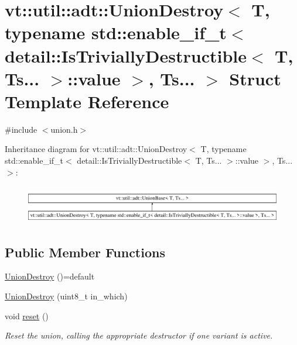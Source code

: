 \hypertarget{structvt_1_1util_1_1adt_1_1_union_destroy_3_01_t_00_01typename_01std_1_1enable__if__t_3_01detail42179a636679a7a81522739bdddb7210}{}\section{vt\+:\+:util\+:\+:adt\+:\+:Union\+Destroy$<$ T, typename std\+:\+:enable\+\_\+if\+\_\+t$<$ detail\+:\+:Is\+Trivially\+Destructible$<$ T, Ts... $>$\+:\+:value $>$, Ts... $>$ Struct Template Reference}
\label{structvt_1_1util_1_1adt_1_1_union_destroy_3_01_t_00_01typename_01std_1_1enable__if__t_3_01detail42179a636679a7a81522739bdddb7210}


{\ttfamily \#include $<$union.\+h$>$}

Inheritance diagram for vt\+:\+:util\+:\+:adt\+:\+:Union\+Destroy$<$ T, typename std\+:\+:enable\+\_\+if\+\_\+t$<$ detail\+:\+:Is\+Trivially\+Destructible$<$ T, Ts... $>$\+:\+:value $>$, Ts... $>$\+:\begin{figure}[H]
\begin{center}
\leavevmode
\includegraphics[height=1.704718cm]{structvt_1_1util_1_1adt_1_1_union_destroy_3_01_t_00_01typename_01std_1_1enable__if__t_3_01detail42179a636679a7a81522739bdddb7210}
\end{center}
\end{figure}
\subsection*{Public Member Functions}
\begin{DoxyCompactItemize}
\item 
\hyperlink{structvt_1_1util_1_1adt_1_1_union_destroy_3_01_t_00_01typename_01std_1_1enable__if__t_3_01detail42179a636679a7a81522739bdddb7210_a9754ad167ee9844764f02d976110d53e}{Union\+Destroy} ()=default
\item 
\hyperlink{structvt_1_1util_1_1adt_1_1_union_destroy_3_01_t_00_01typename_01std_1_1enable__if__t_3_01detail42179a636679a7a81522739bdddb7210_aab76556b3fdd29b060495fdce22a5c83}{Union\+Destroy} (uint8\+\_\+t in\+\_\+which)
\item 
void \hyperlink{structvt_1_1util_1_1adt_1_1_union_destroy_3_01_t_00_01typename_01std_1_1enable__if__t_3_01detail42179a636679a7a81522739bdddb7210_a829cc75c996bd60ba4591d1d85dd3a28}{reset} ()
\begin{DoxyCompactList}\small\item\em Reset the union, calling the appropriate destructor if one variant is active. \end{DoxyCompactList}\end{DoxyCompactItemize}
